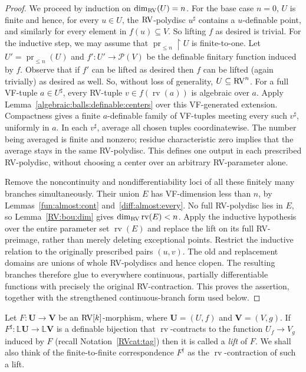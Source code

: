 \documentclass[12pt]{amsart}
\newcommand{\memph}[1]{{\color{magenta}\emph{#1}}}
\theoremstyle{plain}
\theoremstyle{definition}
\theoremstyle{remark}
\numberwithin{equation}{section}
\theoremstyle{plain}
\newcommand{\RV}{\textup{RV}}
\DeclareMathOperator{\pr}{pr}
\newcommand{\0}{\emptyset}
\newcommand{\mdl}[1]{\mathcal{#1}}  %
\newcommand{\bb}[1]{\mathbb{#1}}
\newcommand{\rest}{\upharpoonright}
\newcommand{\fun}{\longrightarrow}
\newcommand{\sub}{\subseteq}
\DeclareMathOperator{\rv}{rv}
\begin{document}
\begin{proof}
We proceed by induction on $\dim_{\RV}(U) = n$. For the base case $n=0$, $U$ is finite and hence, for every $u \in U$, the $\RV$-polydisc $u^\sharp$ contains a $u$-definable point, and similarly for every element in $f(u) \sub V$. So lifting $f$ as desired is trivial. For the inductive step, we may assume that $\pr_{\leq n} \rest U$ is finite-to-one. Let $U' = \pr_{\leq n}(U)$ and $f' : U' \fun \mdl P(V)$ be the definable finitary function induced by $f$. Observe that if $f'$ can be lifted as desired then  $f$ can be lifted (again trivially) as desired as well. So, without loss of generality,  $U \sub \RV^n$. For a full VF-tuple $a\in U^\sharp$, every RV-tuple $v\in f(\rv(a))$ is algebraic over $a$. Apply Lemma~\ref{algebraic:balls:definable:centers} over this VF-generated extension. Compactness gives a finite $a$-definable family of VF-tuples meeting every such $v^\sharp$, uniformly in $a$. In each $v^\sharp$, average all chosen tuples coordinatewise. The number being averaged is finite and nonzero; residue characteristic zero implies that the average stays in the same RV-polydisc. This defines one output in each prescribed RV-polydisc, without choosing a center over an arbitrary RV-parameter alone.

Remove the noncontinuity and nondifferentiability loci of all these finitely many branches simultaneously. Their union $E$ has VF-dimension less than $n$, by Lemmas~\ref{fun:almost:cont} and~\ref{diff:almost:every}. No full RV-polydisc lies in $E$, so Lemma~\ref{RV:bou:dim} gives $\dim_{\RV}\rv(E)<n$. Apply the inductive hypothesis over the entire parameter set $\rv(E)$ and replace the lift on its full RV-preimage, rather than merely deleting exceptional points. Restrict the inductive relation to the originally prescribed pairs $(u,v)$. The old and replacement domains are unions of whole RV-polydiscs and hence clopen. The resulting branches therefore glue to everywhere continuous, partially differentiable functions with precisely the original RV-contraction. This proves the assertion, together with the strengthened continuous-branch form used below.
\end{proof}


Let $F: \bm U \fun \bm V$ be an $\RV[k]$-morphism, where $\bm U = (U, f)$ and $\bm V = (V, g)$. If $F^{\sharp} : \bb L \bm U \fun \bb L \bm V$ is a definable bijection that $\rv$-contracts to the function $U_f \fun V_g$ induced by $F$ (recall Notation~\ref{RVcat:tag}) then it is called a \memph{lift} of $F$. We shall also think of the finite-to-finite correspondence $F^\dag$ as the $\rv$-contraction of such a lift.
\end{document}
